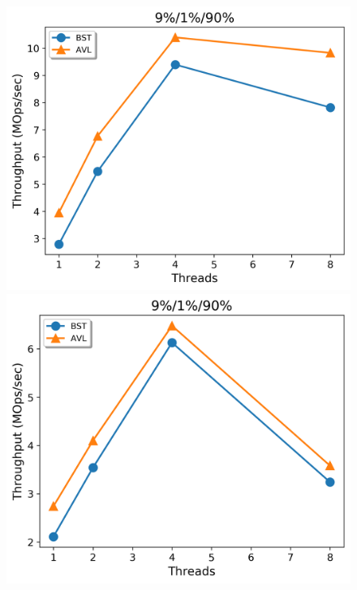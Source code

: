 \documentclass[conference]{IEEEtran}
\theoremstyle{definition}
\theoremstyle{theorem}
\begin{document}
\begin{figure}[t]
 \centering
\begin{minipage}{0.33\textwidth}
	\centering
 {\includegraphics[width =1\linewidth]{figures/conc-9-1-90.png}}
 {\includegraphics[width =1\linewidth]{figures/stm1-9-1-90.png}}

\end{minipage}
\end{figure}
\end{document}

